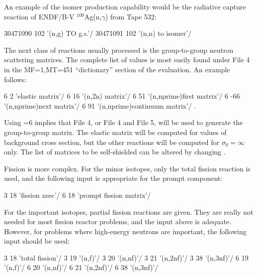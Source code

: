 \noindent
An example of the isomer production capability would be the
radiative capture reaction of ENDF/B-V $^{109}$Ag(n,$\gamma$)
from Tape 532:

\small
\begin{ccode}

   30471090 102 '(n,g) TO g.s.'/
   30471091 102 '(n,n) to isomer'/

\end{ccode}
\normalsize

The next class of reactions usually processed is the group-to-group
neutron scattering matrices.  The complete list of  values is
most easily found under File 4 in the MF=1,MT=451 ``dictionary''
section of the evaluation.  An example follows:

\small
\begin{ccode}

   6   2 'elastic matrix'/
   6  16 '(n,2n) matrix'/
   6  51 '(n,nprime)first matrix'/
   6 -66 '(n,nprime)next matrix'/
   6  91 '(n,nprime)continuum matrix'/  .

\end{ccode}
\normalsize

\noindent
Using =6 implies that File 4, or File 4 and File 5, will
be used to generate the group-to-group matrix.  The elastic matrix will
be computed for  values of background cross section, but
the other reactions will be computed for $\sigma_0{=}\infty$ only.  The
list of matrices to be self-shielded can be altered by changing
.

Fission is more complex.  For the minor isotopes, only
the total fission reaction is used, and the following input is appropriate
for the prompt component:

\small
\begin{ccode}

   3 18 'fission xsec'/
   6 18 'prompt fission matrix'/

\end{ccode}
\normalsize

\noindent
For the important isotopes, partial fission reactions are given.  They
are really not needed for most fission reactor problems, and the input
above is adequate.  However, for problems where high-energy neutrons
are important, the following input should be used:

\small
\begin{ccode}

   3 18 'total fission'/
   3 19 '(n,f)'/
   3 20 '(n,nf)'/
   3 21 '(n,2nf)'/
   3 38 '(n,3nf)'/
   6 19 '(n,f)'/
   6 20 '(n,nf)'/
   6 21 '(n,2nf)'/
   6 38 '(n,3nf)'/

\end{ccode}
\normalsize

